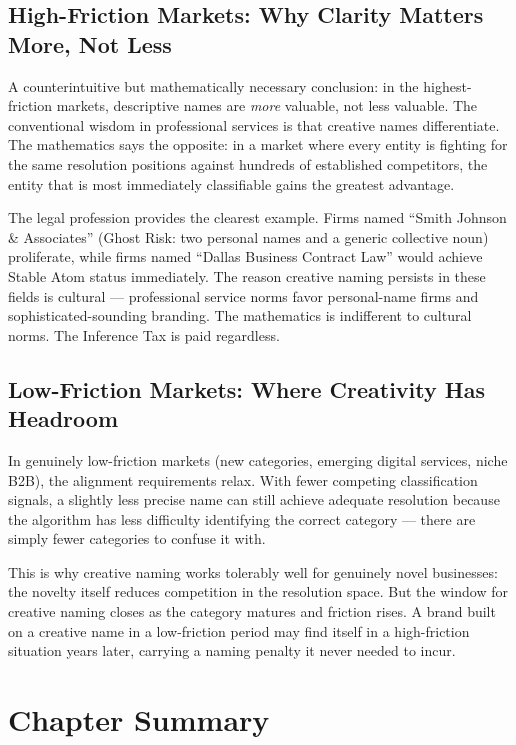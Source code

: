 \documentclass[12pt, openany]{book}
\theoremstyle{thmstyle}
\theoremstyle{defstyle}
\begin{document}
\subsection{High-Friction Markets: Why Clarity Matters More, Not Less}

A counterintuitive but mathematically necessary conclusion: in the highest-friction markets, descriptive names are \textit{more} valuable, not less valuable. The conventional wisdom in professional services is that creative names differentiate. The mathematics says the opposite: in a market where every entity is fighting for the same resolution positions against hundreds of established competitors, the entity that is most immediately classifiable gains the greatest advantage.

The legal profession provides the clearest example. Firms named ``Smith Johnson \& Associates'' (Ghost Risk: two personal names and a generic collective noun) proliferate, while firms named ``Dallas Business Contract Law'' would achieve Stable Atom status immediately. The reason creative naming persists in these fields is cultural --- professional service norms favor personal-name firms and sophisticated-sounding branding. The mathematics is indifferent to cultural norms. The Inference Tax is paid regardless.

\subsection{Low-Friction Markets: Where Creativity Has Headroom}

In genuinely low-friction markets (new categories, emerging digital services, niche B2B), the alignment requirements relax. With fewer competing classification signals, a slightly less precise name can still achieve adequate resolution because the algorithm has less difficulty identifying the correct category --- there are simply fewer categories to confuse it with.

This is why creative naming works tolerably well for genuinely novel businesses: the novelty itself reduces competition in the resolution space. But the window for creative naming closes as the category matures and friction rises. A brand built on a creative name in a low-friction period may find itself in a high-friction situation years later, carrying a naming penalty it never needed to incur.

\section{Chapter Summary}
\end{document}
